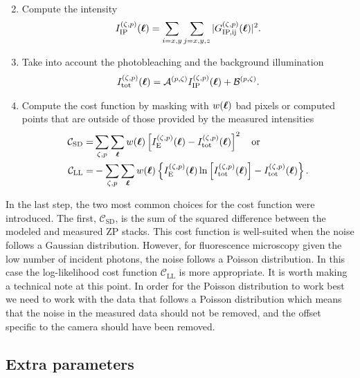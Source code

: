 \documentclass[reprint,aps,pra,superscriptaddress,
amsmath,amssymb]{revtex4-1}
\begin{document}
\begin{enumerate}
\begin{align*}
\end{align*}
\item Compute the intensity 
\begin{align*}
I^{(\zeta ,p)}_\text{IP} (\boldsymbol \ell )  = \sum_{i=x,y} \sum_{j=x,y,z} |G^{(\zeta ,p)}_\text{IP,ij}( \boldsymbol \ell )|^2.
\end{align*}
\item Take into  account the photobleaching and the background illumination 
\begin{align*}
I^{(\zeta ,p)}_\text{tot} (\boldsymbol \ell )  =  \mathcal{A}^{(p,\zeta)} I^{(\zeta ,p)}_\text{IP} (\boldsymbol \ell ) + \mathcal{B}^{(p,\zeta)} .
\end{align*}
\item Compute the cost function by masking with $w(\boldsymbol \ell)$ bad pixels or computed points that are outside of those provided by the measured intensities 
\begin{align*}
\mathcal{C}_\text{SD} = & \sum_{\zeta, p} \sum_{\boldsymbol \ell } w(\boldsymbol \ell )  \left[ I^{(\zeta ,p)}_\text{E}(\boldsymbol \ell ) -I^{(\zeta ,p)}_\text{tot} (\boldsymbol \ell ) \right]^2 \quad \text{or} \\
\mathcal{C}_\text{LL} = &- \sum_{\zeta, p} \sum_{\boldsymbol \ell }  w(\boldsymbol \ell ) \left\{ I^{(\zeta ,p)}_\text{E} (\boldsymbol \ell ) \ln \left[  I^{(\zeta ,p)}_\text{tot} (\boldsymbol \ell ) \right] - I^{(\zeta ,p)}_\text{tot} (\boldsymbol \ell ) \right\}.
\end{align*}
\end{enumerate}
In the last step, the two most common choices for the cost function were introduced. The first, $ \mathcal{C}_\text{SD}$, is the sum of the squared difference between the modeled and measured ZP stacks. 
This cost function is well-suited when the noise follows a Gaussian distribution. However, for fluorescence microscopy given the low number of incident photons, the noise follows a Poisson distribution. In this case the log-likelihood cost function $\mathcal{C}_\text{LL}$ is more appropriate. It is worth making a technical note at this point. In order for the Poisson distribution to work best we need to work with the data that follows a Poisson distribution which means that the noise in the measured data should not be removed, and the offset specific to the camera should have been removed.



\subsection{Extra parameters}
\end{document}
